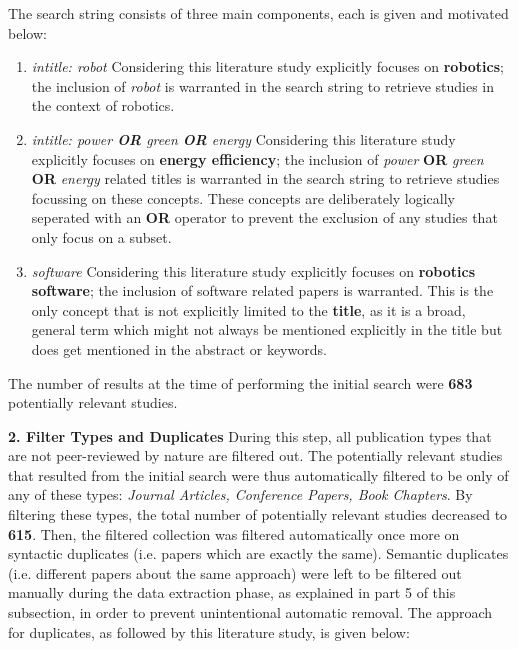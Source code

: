 The search string consists of three main components, each is given and motivated below:
\begin{enumerate}
    \item \textit{intitle: robot} \newline
    Considering this literature study explicitly focuses on \textbf{robotics}; 
    the inclusion of \textit{robot} is warranted in the search string to retrieve studies in the context of robotics.

    \item \textit{intitle: power \textbf{OR} green \textbf{OR} energy} \newline 
    Considering this literature study explicitly focuses on \textbf{energy efficiency};
    the inclusion of \textit{power} \textbf{OR} \textit{green} \textbf{OR} \textit{energy} related titles is warranted in the search string to retrieve studies focussing on 
    these concepts.
    These concepts are deliberately logically seperated with an \textbf{OR} operator to prevent the exclusion of any studies that only focus on a subset.

    \item \textit{software} \newline
    Considering this literature study explicitly focuses on \textbf{robotics software};
    the inclusion of software related papers is warranted.
    This is the only concept that is not explicitly limited to the \textbf{title}, as it is a broad, general term which might not always be mentioned
    explicitly in the title but does get mentioned in the abstract or keywords.
    
\end{enumerate}
The number of results at the time of performing the initial search were \textbf{683} potentially relevant studies.

\vspace{2mm}

\noindent\textbf{2. Filter Types and Duplicates}
During this step, all publication types that are not peer-reviewed by nature are filtered out. 
The potentially relevant studies that resulted from the initial search were thus automatically filtered to be only of any of these types: 
\textit{Journal Articles, Conference Papers, Book Chapters}.
By filtering these types, the total number of potentially relevant studies decreased to \textbf{615}. 
Then, the filtered collection was filtered automatically once more on 
syntactic duplicates (i.e. papers which are exactly the same). 
Semantic duplicates (i.e. different papers about the same approach) were left to be filtered out manually during the data extraction phase, 
as explained in part 5 of this subsection, in order to prevent unintentional automatic removal. 
The approach for duplicates, as followed by this literature study, is given below:

